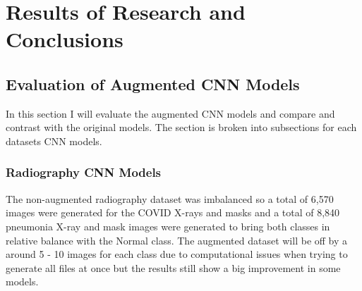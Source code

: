 \chapter{Results of Research and Conclusions}
\section{Evaluation of Augmented CNN Models}
In this section I will evaluate the augmented CNN models and compare and contrast with the original models.  The section is broken into subsections for each datasets CNN models.
\subsection{Radiography CNN Models}
  The non-augmented radiography dataset was imbalanced so a total of 6,570 images were generated for the COVID X-rays and masks and a total of 8,840 pneumonia X-ray and mask images were generated to bring both classes in relative balance with the Normal class.  The augmented dataset will be off by a around 5 - 10 images for each class due to computational issues when trying to generate all files at once but the results still show a big improvement in some models.
